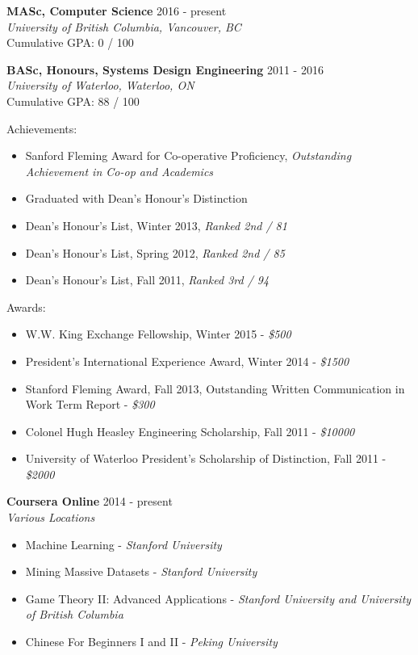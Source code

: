 \documentclass[10pt]{res} %
\begin{document}
\begin{resume}
\vspace{0.2in} %

\textbf {MASc, Computer Science} \hfill 2016 - present \\ 
{\sl University of British Columbia, Vancouver, BC} \\
Cumulative GPA: 0 / 100  

\textbf {BASc, Honours, Systems Design Engineering} \hfill 2011 - 2016 \\ 
{\sl University of Waterloo, Waterloo, ON} \\
Cumulative GPA: 88 / 100

Achievements:
\begin{itemize} 
    \item Sanford Fleming Award for Co-operative Proficiency, {\sl Outstanding Achievement in Co-op and Academics}
    \item Graduated with Dean's Honour's Distinction
    \item Dean's Honour's List, Winter 2013, {\sl Ranked 2nd / 81}
    \item Dean's Honour's List, Spring 2012, {\sl Ranked 2nd / 85}
    \item Dean's Honour's List, Fall 2011, {\sl Ranked 3rd / 94}
\end{itemize}

Awards:
\begin{itemize} 
    \item W.W. King Exchange Fellowship, Winter 2015 - {\sl\$500}
    \item President's International Experience Award, Winter 2014 - {\sl\$1500}
    \item Stanford Fleming Award, Fall 2013, Outstanding Written Communication in Work Term Report - {\sl\$300}
    \item Colonel Hugh Heasley Engineering Scholarship, Fall 2011 - {\sl\$10000}
    \item University of Waterloo President's Scholarship of Distinction, Fall 2011 - {\sl\$2000}
\end{itemize}

\textbf {Coursera Online} \hfill 2014 - present \\
{\sl Various Locations}

\begin{itemize} 
    \item Machine Learning - {\sl Stanford University}
    \item Mining Massive Datasets - {\sl Stanford University}
    \item Game Theory II: Advanced Applications - {\sl Stanford University and University of British Columbia}
    \item Chinese For Beginners I and II - {\sl Peking University}
\end{itemize}


\end{resume}
\end{document}
